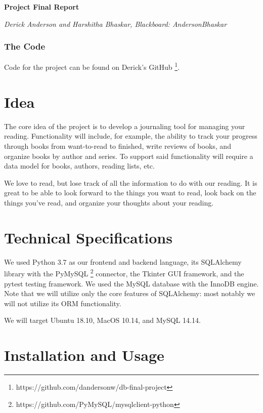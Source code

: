 \documentclass{article}
\begin{document}

\begin{center}
  \textbf{Project Final Report}

  \textit{Derick Anderson and Harshitha Bhaskar, Blackboard: AndersonBhaskar}
\end{center}

\subsubsection*{The Code}

Code for the project can be found on Derick's GitHub
\footnote{https://github.com/dandersonw/db-final-project}.

\section*{Idea}

The core idea of the project is to develop a journaling tool for managing your
reading. Functionality will include, for example, the ability to track your
progress through books from want-to-read to finished, write reviews of books,
and organize books by author and series. To support said functionality will
require a data model for books, authors, reading lists, etc.

We love to read, but lose track of all the information to do with our
reading. It is great to be able to look forward to the things you want to read,
look back on the things you’ve read, and organize your thoughts about your
reading.

\section*{Technical Specifications}

We used Python 3.7 as our frontend and backend language,
its SQLAlchemy library with the
PyMySQL \footnote{https://github.com/PyMySQL/mysqlclient-python}
connector,
the Tkinter GUI framework,
and the pytest testing framework.
We used the MySQL database with the InnoDB engine.
Note that we will utilize only the core features of SQLAlchemy:
most notably we will not utilize its ORM functionality.

\noindent
We will target Ubuntu 18.10, MacOS 10.14, and MySQL 14.14.

\section*{Installation and Usage}
\end{document}
